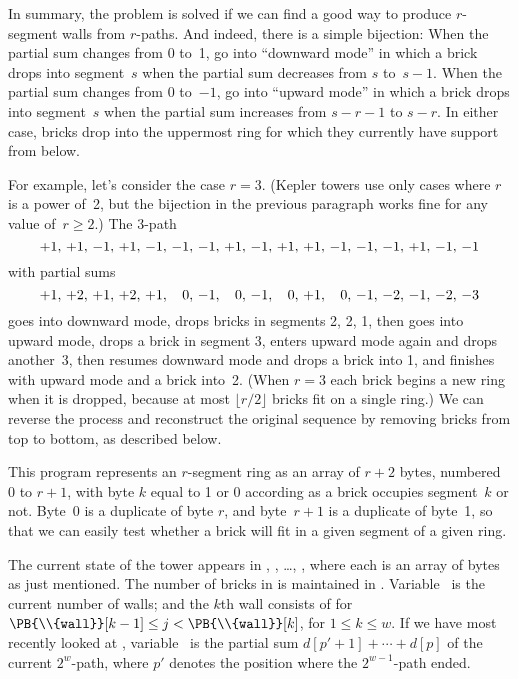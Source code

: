 In summary, the problem is solved if we can find a good way to produce
$r$-segment walls from $r$-paths. And indeed, there is a simple
bijection: When the partial sum changes from 0 to~1, go into ``downward
mode'' in which a brick drops into segment~$s$ when the partial
sum decreases from $s$ to~$s-1$. When the partial sum changes from
0 to~$-1$, go into ``upward mode'' in which a brick drops into segment~$s$
when the partial sum increases from $s-r-1$ to $s-r$. In either case,
bricks drop into the uppermost ring for which they currently
have support from below.

For example, let's consider the case $r=3$. (Kepler towers use only
cases where $r$ is a power of~2, but the bijection in the previous
paragraph works fine for any value of~$r\ge2$.) The 3-path
$$\thinmuskip=6mu
+1,+1,-1,+1,-1,-1,-1,+1,-1,+1,+1,-1,-1,-1,+1,-1,-1$$
with partial sums
$$\thinmuskip=6mu \def~{\phantom{{+}}}
+1,+2,+1,+2,+1,~0,-1,~0,-1,~0,+1,~0,-1,-2,-1,-2,-3$$
goes into downward mode, drops bricks in segments 2, 2, 1, then goes
into upward mode, drops a brick in segment 3, enters upward mode
again and drops another~3, then resumes downward mode
and drops a brick into 1, and finishes with upward mode and a brick
into~2. (When $r=3$ each brick begins a new ring when it is dropped,
because at most $\lfloor r/2\rfloor$ bricks fit on a single ring.)
We can reverse the process and reconstruct the original sequence
by removing bricks from top to bottom, as described below.

\fi

This program represents an $r$-segment ring as an array of
$r+2$
bytes, numbered 0 to $r+1$, with byte $k$ equal to 1 or 0
according as a brick occupies segment~$k$ or not.
Byte~0 is a duplicate of byte $r$, and byte~$r+1$
is a duplicate of byte~1, so that we can easily test whether a
brick will fit in a given segment of a given ring.

The current state of the tower appears in , , \dots,
, where each  is an array of bytes as just
mentioned.
The number of bricks in  is maintained in .
Variable~ is the current number of walls; and
the $k$th wall consists of  for $\PB{\\{wall}}[k-1]\le j<\PB{%
\\{wall}}[k]$,
for $1\le k\le w$.
If we have most recently looked at , variable~ is the
partial
sum $d[p'+1]+\cdots+d[p]$ of the current $2^w$-path, where $p'$ denotes
the position where the $2^{w-1}$-path ended.

